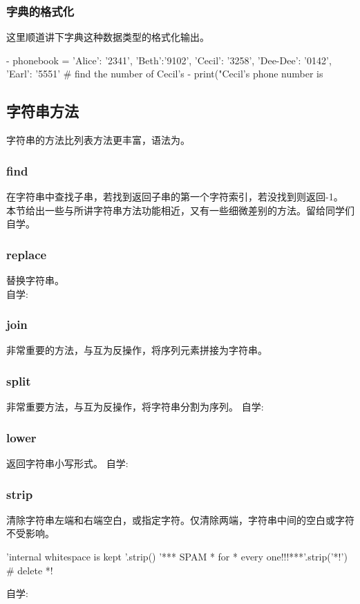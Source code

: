 \subsubsection{字典的格式化}
这里顺道讲下字典这种数据类型的格式化输出。
\begin{python}
- phonebook = {'Alice': '2341', 'Beth':'9102', 'Cecil': '3258',
  'Dee-Dee': '0142', 'Earl': '5551'}
# find the number of Cecil's
- print("Cecil's phone number is %
\end{python}
\subsection{字符串方法}
字符串的方法比列表方法更丰富，语法为。
\subsubsection{find}
在字符串中查找子串，若找到返回子串的第一个字符索引，若没找到则返回-1。
本节给出一些与所讲字符串方法功能相近，又有一些细微差别的方法。留给同学们自学。
\subsubsection{replace}
替换字符串。
 \\
自学: 
\subsubsection{join}
非常重要的方法，与互为反操作，将序列元素拼接为字符串。
\subsubsection{split}
非常重要方法，与互为反操作，将字符串分割为序列。
自学: 
\subsubsection{lower}
返回字符串小写形式。
自学:
\subsubsection{strip}
清除字符串左端和右端空白，或指定字符。仅清除两端，字符串中间的空白或字符不受影响。
\begin{python}
'internal whitespace is kept '.strip()
'*** SPAM * for * every one!!!***'.strip('*!') #  delete *!
\end{python}
自学:
